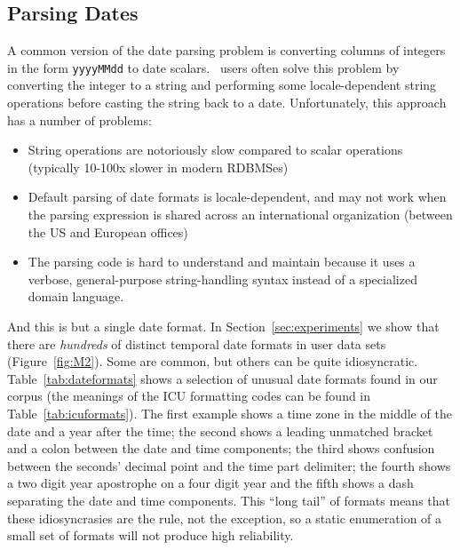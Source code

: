 \subsection{Parsing Dates}
A common version of the date parsing problem is converting columns of integers in the form \texttt{yyyyMMdd} to date scalars. \Naive\ users often solve this problem by converting the integer to a string and performing some locale-dependent string operations before casting the string back to a date. Unfortunately, this approach has a number of problems:
\begin{itemize}
\setlength\itemsep{0em}
\item String operations are notoriously slow compared to scalar operations (typically 10-100x slower in modern RDBMSes)
\item Default parsing of date formats is locale-dependent, and may not work when the parsing expression is shared across an international organization (\eg between the US and European offices)
\item The parsing code is hard to understand and maintain because it uses a verbose, general-purpose string-handling syntax instead of a specialized domain language.
\end{itemize}

And this is but a single date format. In Section~\ref{sec:experiments} we show that there are \textit{hundreds} of distinct temporal date formats in user data sets (\cf Figure~\ref{fig:M2}).
Some are common, but others can be quite idiosyncratic. 
Table~\ref{tab:dateformats} shows a selection of unusual date formats found in our corpus (the meanings of the ICU formatting codes can be found in Table~\ref{tab:icuformats}). 
The first example shows a time zone in the middle of the date and a year after the time; 
the second shows a leading unmatched bracket and a colon between the date and time components; 
the third shows confusion between the seconds' decimal point and the time part delimiter; 
the fourth shows a two digit year apostrophe on a four digit year and the fifth shows a dash separating the date and time components. 
This ``long tail'' of formats means that these idiosyncrasies are the rule, not the exception, 
so a static enumeration of a small set of formats will not produce high reliability.

